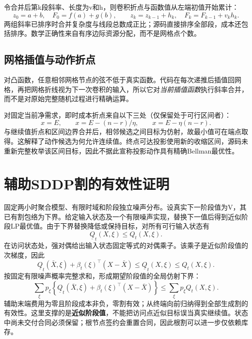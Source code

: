 令合并后第k段斜率、长度为v和h，则卷积折点与函数值从左端初值开始累计：
\begin{equation}
 z_0=a+b,\quad F_0=f(a)+g(b),\qquad
 z_k=z_{k-1}+h_k,\quad F_k=F_{k-1}+v_kh_k.
\end{equation}
两组斜率已排序时合并复杂度与线段总数成正比；源码直接排序全部段，成本还包括排序。数学正确性来自有序边际资源分配，而不是网格点个数。

\subsection{网格插值与动作折点}
对凸函数，任意相邻网格节点的弦不低于真实函数。代码在每次递推后插值回网格，再把网格折线视为下一次卷积的输入，所以它对\emph{当前插值函数}执行斜率合并，而不是对原始完整随机过程进行精确运算。

对固定当前净需求，即时成本折点来自以下三处（仅保留处于可行区间者）：
\begin{equation}
 x=E,\qquad x=E-(n-r)/\eta,\qquad x=E-\eta(n-r).
\end{equation}
与继续值折点和区间边界合并后，相邻候选之间目标为仿射，故最小值可在端点取得。这解释了动作候选为何允许连续值。终点可达投影使用新的收缩区间，源码未重新完整枚举该区间目标，因此不据此宣称投影动作具有精确Bellman最优性。

\section{辅助SDDP割的有效性证明}
固定两小时聚合模型、有限时域和阶段独立噪声分布。设真实下一阶段值为V，其已有割包络为下界。给定输入状态及一个有限噪声实现，替换下一值后得到近似阶段LP最优值。由于下界替换降低或保持目标，对所有可行输入状态有
\begin{equation}
 \underline Q_t(X,\xi)\le Q_t(X,\xi).
\end{equation}
在访问状态处，强对偶给出输入状态固定等式的对偶乘子。该乘子是近似阶段值的次梯度，因此
\begin{equation}
 \underline Q_t(\bar X,\xi)+\beta_t(\xi)^\top(X-\bar X)
 \le\underline Q_t(X,\xi)\le Q_t(X,\xi).
\end{equation}
按固定有限噪声概率完整求和，形成期望阶段值的全局仿射下界：
\begin{equation}
 \sum_{\xi}p_\xi\left\{\underline Q_t(\bar X,\xi)+\beta_t(\xi)^\top(X-\bar X)\right\}
 \le \sum_\xi p_\xi Q_t(X,\xi).
\end{equation}
辅助末端费用为零且阶段成本非负，零割有效；从终端向前归纳得到全部生成割的有效性。这里支撑的是\textbf{近似阶段值}，不能把访问点近似目标误当真实继续值。状态中尚未交付合同必须保留；根节点签约会重置合同，因此根割可以进一步仅依赖库存。

